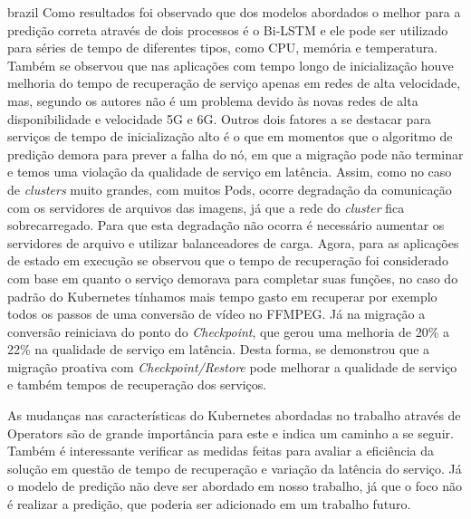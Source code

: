 \begin{otherlanguage*}{brazil}
Como resultados foi observado que dos modelos abordados o melhor para a predição
correta através de dois processos é o Bi-LSTM e ele pode ser utilizado para séries
de tempo de diferentes tipos, como CPU, memória e temperatura. Também se observou
que nas aplicações com tempo longo de inicialização houve melhoria do tempo de
recuperação de serviço apenas em redes de alta velocidade, mas, segundo os autores
não é um problema devido às novas redes de alta disponibilidade e velocidade 5G e
6G. Outros dois fatores a se destacar para serviços de tempo de inicialização alto
é o que em momentos que o algoritmo de predição demora para prever a falha do nó, em que
a migração pode não terminar e temos uma violação da qualidade de serviço em latência.
Assim, como no caso de \textit{clusters} muito grandes, com muitos Pods, ocorre
degradação da comunicação com os servidores de arquivos das imagens, já que a rede
do \textit{cluster} fica sobrecarregado. Para que esta degradação não ocorra é necessário
aumentar os servidores de arquivo e utilizar balanceadores de carga. Agora, para
as aplicações de estado em execução se observou que o tempo de recuperação foi
considerado com base em quanto o serviço demorava para completar suas funções, no
caso do padrão do Kubernetes tínhamos mais tempo gasto em recuperar por exemplo
todos os passos de uma conversão de vídeo no FFMPEG. Já na migração a conversão
reiniciava do ponto do \textit{Checkpoint}, que gerou uma melhoria de 20\% a 22\%
na qualidade de serviço em latência. Desta forma, se demonstrou que a migração
proativa com \textit{Checkpoint/Restore} pode melhorar a qualidade de serviço e
também tempos de recuperação dos serviços.

As mudanças nas características do Kubernetes abordadas no trabalho através de
Operators são de grande importância para este e indica um caminho a se seguir.
Também é interessante verificar as medidas feitas para avaliar a eficiência da
solução em questão de tempo de recuperação e variação da latência do serviço. Já
o modelo de predição não deve ser abordado em nosso trabalho, já que o foco não
é realizar a predição, que poderia ser adicionado em um trabalho futuro.

\end{otherlanguage*}

